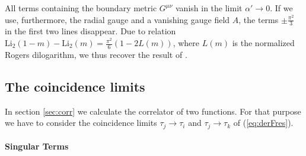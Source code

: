 \documentclass[a4paper,12pt]{article}
\newcommand {\Li} {\mathrm{Li}_2}
\begin{document}
All terms containing the boundary metric $G^{\mu\nu}$ vanish in
the limit $\alpha'\!\rightarrow\!0$. If we use, furthermore, the
radial gauge and a vanishing gauge field $A$, the terms $\pm \frac{\pi^2}3$ in
the first two lines disappear. 
Due to relation
$\Li(1-m) - \Li(m) = \frac {\pi^2}{6}(1 - 2 L(m))$, where $L(m)$ is the 
normalized Rogers dilogarithm, we thus recover the result of 
\cite{Cornalba:2001sm}.


\subsection{The coincidence limits}

In section \ref{sec:corr} we calculate the correlator of two functions.
For that purpose we have to consider the coincidence limits 
$\tau_j \rightarrow \tau_i$ and $\tau_j \rightarrow \tau_k$ of
(\ref{eq:derFres}). 

\paragraph{Singular Terms}
\end{document}
